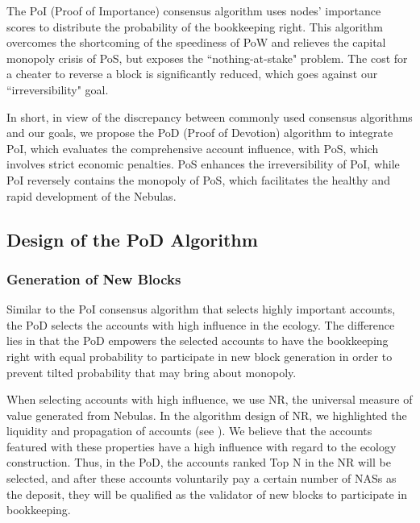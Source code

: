 The PoI (Proof of Importance) consensus algorithm uses nodes' importance scores to distribute the probability of the bookkeeping right. This algorithm overcomes the shortcoming of the speediness of PoW and relieves the capital monopoly crisis of PoS, but exposes the ``nothing-at-stake" problem. The cost for a cheater to reverse a block is significantly reduced, which goes against our ``irreversibility" goal.

In short, in view of the discrepancy between commonly used consensus algorithms and our goals, we propose the PoD (Proof of Devotion) algorithm to integrate PoI, which evaluates the comprehensive account influence, with PoS, which involves strict economic penalties. PoS enhances the irreversibility of PoI, while PoI reversely contains the monopoly of PoS, which facilitates the healthy and rapid development of the Nebulas.

\subsection{Design of the PoD Algorithm}
\label{pod:design}

\subsubsection{Generation of New Blocks}
\label{pod:design:block}

Similar to the PoI consensus algorithm that selects highly important accounts, the PoD selects the accounts with high influence in the ecology. The difference lies in that the PoD empowers the selected accounts to have the bookkeeping right with equal probability to participate in new block generation in order to prevent tilted probability that may bring about monopoly.


When selecting accounts with high influence, we use NR, the universal measure of value generated from Nebulas. In the algorithm design of NR, we highlighted the liquidity and propagation of accounts (see ). We believe that the accounts featured with these properties have a high influence with regard to the ecology construction. Thus, in the PoD, the accounts ranked Top N in the NR will be selected, and after these accounts voluntarily pay a certain number of NASs as the deposit, they will be qualified as the validator of new blocks to participate in bookkeeping.

